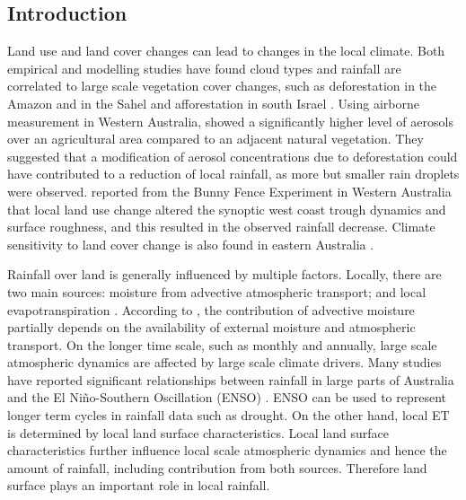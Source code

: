 \documentclass[draft,linenumbers]{agujournal}
\begin{document}
\begin{article}

\section{Introduction}

Land use and land cover changes can lead to changes in the local climate. Both empirical and modelling studies have found cloud types and rainfall are correlated to large scale vegetation cover changes, such as deforestation in the Amazon and in the Sahel \citep{Chagnon2005,Pinto2009, Wang2009, Mei2010, kucharski_further_2013,pitman_scale_2016} and afforestation in south Israel \citep{Otterman1990, Ben-Gai1998}. Using airborne measurement in Western Australia, \citet{Junkermann2009} showed a significantly higher level of aerosols over an agricultural area compared to an adjacent natural vegetation. They suggested that a modification of aerosol concentrations due to deforestation could have contributed to a reduction of local rainfall, as more but smaller rain droplets were observed. \citet{Nair2011} reported from the Bunny Fence Experiment in Western Australia that local land use change altered the synoptic west coast trough dynamics and surface roughness, and this resulted in the observed rainfall decrease. Climate sensitivity to land cover change is also found in eastern Australia \citep{McAlpine2007}. 

Rainfall over land is generally influenced by multiple factors. Locally, there are two main sources: moisture from advective atmospheric transport; and local evapotranspiration \citep{Eltahir1996,Bosilovich2006,Dirmeyer2009,Gimeno2010}. According to \citet{Trenberth1999}, the contribution of advective moisture partially depends on the availability of external moisture and atmospheric transport. On the longer time scale, such as monthly and annually, large scale atmospheric dynamics are affected by large scale climate drivers. Many studies have reported significant relationships between rainfall in large parts of Australia and the El Ni\~{n}o-Southern Oscillation (ENSO) \citep{Verdon2004,Risbey2009,Speer2011}. ENSO can be used to represent longer term cycles in rainfall data such as drought. On the other hand, local ET is determined by local land surface characteristics. Local land surface characteristics further influence local scale atmospheric dynamics and hence the amount of rainfall, including contribution from both sources. Therefore land surface plays an important role in local rainfall. 


\end{article}
\end{document}

